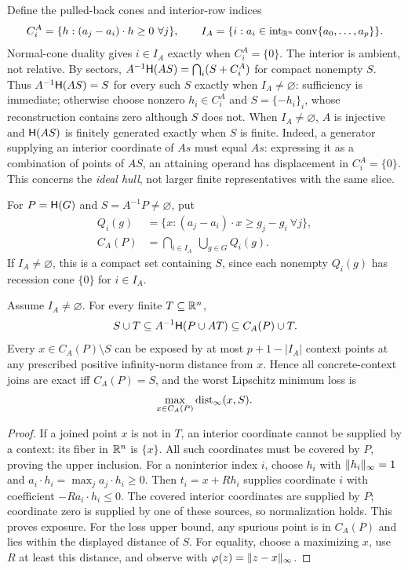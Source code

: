 Define the pulled-back cones and interior-row indices
\[
C_i^A=\{h:(a_j-a_i)\cdot h\ge0\ \forall j\},\qquad
I_A=\{i:a_i\in\operatorname{int}_{\mathbb R^n}\operatorname{conv}\{a_0,\ldots,a_p\}\}.
\]
Normal-cone duality gives $i\in I_A$ exactly when $C_i^A=\{0\}$. The interior is ambient, not relative. By sectors,
$A^{-1}\mathsf H(AS)=\bigcap_i(S+C_i^A)$ for compact nonempty $S$.
Thus $A^{-1}\mathsf H(AS)=S$ for every such $S$ exactly when $I_A\ne\varnothing$: sufficiency is immediate; otherwise choose nonzero $h_i\in C_i^A$ and $S=\{-h_i\}_i$, whose reconstruction contains zero although $S$ does not. When $I_A\ne\varnothing$, $A$ is injective and $\mathsf H(AS)$ is finitely generated exactly when $S$ is finite. Indeed, a generator supplying an interior coordinate of $As$ must equal $As$: expressing it as a combination of points of $AS$, an attaining operand has displacement in $C_i^A=\{0\}$. This concerns the \emph{ideal hull}, not larger finite representatives with the same slice.

For $P=\mathsf H(G)$ and $S=A^{-1}P\ne\varnothing$, put
\begin{align}
Q_i(g)&=\{x:(a_j-a_i)\cdot x\ge g_j-g_i\ \forall j\},\nonumber\\
C_A(P)&=\bigcap_{i\in I_A}\ \bigcup_{g\in G}Q_i(g).\label{eq:defect-set}
\end{align}
If $I_A\ne\varnothing$, this is a compact set containing $S$, since each nonempty $Q_i(g)$ has recession cone $\{0\}$ for $i\in I_A$.

\begin{proposition}\label{prop:fidelity}
Assume $I_A\ne\varnothing$. For every finite $T\subseteq\mathbb R^n$,
\[
S\cup T\subseteq A^{-1}\mathsf H(P\cup AT)\subseteq C_A(P)\cup T.
\]
Every $x\in C_A(P)\setminus S$ can be exposed by at most $p+1-|I_A|$ context points at any prescribed positive infinity-norm distance from $x$. Hence all concrete-context joins are exact iff $C_A(P)=S$, and the worst Lipschitz minimum loss is
\[
\max_{x\in C_A(P)}\operatorname{dist}_\infty(x,S).
\]
\end{proposition}
\begin{proof}
If a joined point $x$ is not in $T$, an interior coordinate cannot be supplied by a context: its fiber in $\mathbb R^n$ is $\{x\}$. All such coordinates must be covered by $P$, proving the upper inclusion. For a noninterior index $i$, choose $h_i$ with $\lVert h_i\rVert_\infty=1$ and
$a_i\cdot h_i=\max_j a_j\cdot h_i\ge0$. Then $t_i=x+Rh_i$ supplies coordinate $i$ with coefficient $-R a_i\cdot h_i\le0$. The covered interior coordinates are supplied by $P$; coordinate zero is supplied by one of these sources, so normalization holds. This proves exposure. For the loss upper bound, any spurious point is in $C_A(P)$ and lies within the displayed distance of $S$. For equality, choose a maximizing $x$, use $R$ at least this distance, and observe with $\varphi(z)=\lVert z-x\rVert_\infty$.
\end{proof}

